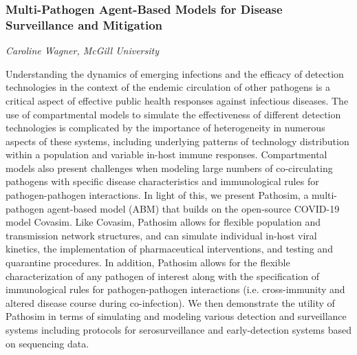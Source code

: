 \subsubsection*{Multi-Pathogen Agent-Based Models for Disease
Surveillance and Mitigation}
\textit{Caroline Wagner, McGill University}

Understanding the dynamics of emerging infections and
the efficacy of detection technologies in the context of the endemic
circulation of other pathogens is a critical aspect of effective public
health responses against infectious diseases. The use of compartmental
models to simulate the effectiveness of different detection technologies
is complicated by the importance of heterogeneity in numerous aspects of
these systems, including underlying patterns of technology distribution
within a population and variable in-host immune responses. Compartmental
models also present challenges when modeling large numbers of
co-circulating pathogens with specific disease characteristics and
immunological rules for pathogen-pathogen interactions. In light of
this, we present Pathosim, a multi-pathogen agent-based model (ABM) that
builds on the open-source COVID-19 model Covasim. Like Covasim, Pathosim
allows for flexible population and transmission network structures, and
can simulate individual in-host viral kinetics, the implementation of
pharmaceutical interventions, and testing and quarantine procedures. In
addition, Pathosim allows for the flexible characterization of any
pathogen of interest along with the specification of immunological rules
for pathogen-pathogen interactions (i.e. cross-immunity and altered
disease course during co-infection). We then demonstrate the utility of
Pathosim in terms of simulating and modeling various detection and
surveillance systems including protocols for serosurveillance and
early-detection systems based on sequencing data.

